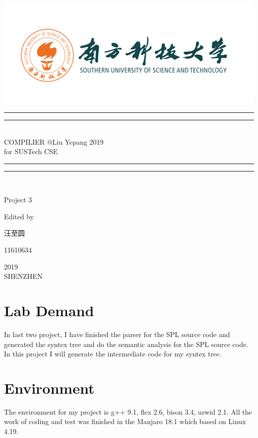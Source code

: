 \documentclass{article}
\begin{document}
 
    \begin{titlepage}       %
        \centering
        \includegraphics[width=\textwidth]{../SUSTC_LOGO.png}
        \rule{\textwidth}{1.6pt}\vspace*{-\baselineskip}\vspace*{2pt}
        \rule{\textwidth}{0.4pt}\\[\baselineskip]
        {\LARGE COMPILIER @Liu Yepang 2019\\[\baselineskip]\small for SUSTech CSE}
        \\[0.2\baselineskip]
        \rule{\textwidth}{0.4pt}\vspace*{-\baselineskip}\vspace{3.2pt}
        \rule{\textwidth}{1.6pt}\\[\baselineskip]
        \scshape
        \vspace*{\baselineskip}
        {\Large Project 3\par }
        Edited by \\[\baselineskip] {汪至圆\par}
        {\Large 11610634\par }
        \vfill
        {\scshape 2019} \\{\large SHENZHEN}\par
    \end{titlepage}

    \section{Lab Demand}
        In last two project, I have finished the parser for the SPL source code and generated the syntex 
        tree and do the semantic analysis for the SPL source code. In this project I will generate the intermediate code for my syntex tree.
        

    \section{Environment}
        The environment for my project is g++ 9.1, flex 2.6, bison 3.4, urwid 2.1. All the work of coding
        and test was finished in the Manjaro 18.1 which based on Linux 4.19.
\end{document}
